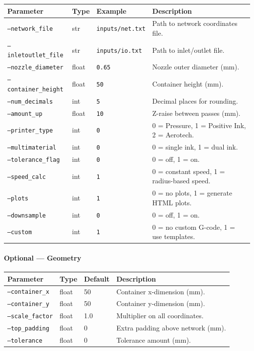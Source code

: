 \documentclass[11pt,letterpaper]{article}
\newcommand{\code}[1]{\texttt{#1}}
\begin{document}
\begin{longtable}{@{}L{3.5cm} l l L{5cm}@{}}
\toprule
\textbf{Parameter} & \textbf{Type} & \textbf{Example} & \textbf{Description} \\
\midrule
\code{--network\_file} & str & \code{inputs/net.txt} & Path to network coordinates file. \\
\code{--inletoutlet\_file} & str & \code{inputs/io.txt} & Path to inlet/outlet file. \\
\code{--nozzle\_diameter} & float & \code{0.65} & Nozzle outer diameter (mm). \\
\code{--container\_height} & float & \code{50} & Container height (mm). \\
\code{--num\_decimals} & int & \code{5} & Decimal places for rounding. \\
\code{--amount\_up} & float & \code{10} & Z-raise between passes (mm). \\
\code{--printer\_type} & int & \code{0} & 0 = Pressure, 1 = Positive Ink, 2 = Aerotech. \\
\code{--multimaterial} & int & \code{0} & 0 = single ink, 1 = dual ink. \\
\code{--tolerance\_flag} & int & \code{0} & 0 = off, 1 = on. \\
\code{--speed\_calc} & int & \code{1} & 0 = constant speed, 1 = radius-based speed. \\
\code{--plots} & int & \code{1} & 0 = no plots, 1 = generate HTML plots. \\
\code{--downsample} & int & \code{0} & 0 = off, 1 = on. \\
\code{--custom} & int & \code{1} & 0 = no custom G-code, 1 = use templates. \\
\bottomrule
\end{longtable}

\paragraph{Optional --- Geometry}

\begin{longtable}{@{}L{3.3cm} l l L{5.5cm}@{}}
\toprule
\textbf{Parameter} & \textbf{Type} & \textbf{Default} & \textbf{Description} \\
\midrule
\code{--container\_x} & float & 50 & Container x-dimension (mm). \\
\code{--container\_y} & float & 50 & Container y-dimension (mm). \\
\code{--scale\_factor} & float & 1.0 & Multiplier on all coordinates. \\
\code{--top\_padding} & float & 0 & Extra padding above network (mm). \\
\code{--tolerance} & float & 0 & Tolerance amount (mm). \\
\bottomrule
\end{longtable}
\end{document}
